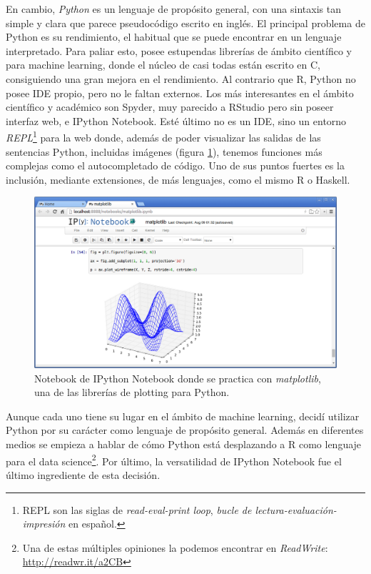 En cambio, \emph{Python} es un lenguaje de propósito general, con una sintaxis tan simple y clara que parece pseudocódigo escrito en inglés. El principal problema de Python es su rendimiento, el habitual que se puede encontrar en un lenguaje interpretado. Para paliar esto, posee estupendas librerías de ámbito científico y para machine learning, donde el núcleo de casi todas están escrito en C, consiguiendo una gran mejora en el rendimiento. Al contrario que R, Python no posee IDE propio, pero no le faltan externos. Los más interesantes en el ámbito científico y académico son Spyder, muy parecido a RStudio pero sin poseer interfaz web, e IPython Notebook. Esté último no es un IDE, sino un entorno \emph{REPL}\footnote{REPL son las siglas de \emph{read-eval-print loop}, \emph{bucle de lectura-evaluación-impresión} en español.} para la web donde, además de poder visualizar las salidas de las sentencias Python, incluidas imágenes (figura \ref{fig:4.2}), tenemos funciones más complejas como el autocompletado de código. Uno de sus puntos fuertes es la inclusión, mediante extensiones, de más lenguajes, como el mismo R o Haskell.

\begin{figure}[H]
  \centering
  \includegraphics[width=133mm]{figures/ch_04/ipython_notebook.png}
  \caption{Notebook de IPython Notebook donde se practica con \emph{matplotlib}, una de las librerías de plotting para Python.}
  \label{fig:4.2}
\end{figure}

Aunque cada uno tiene su lugar en el ámbito de machine learning, decidí utilizar Python por su carácter como lenguaje de propósito general. Además en diferentes medios se empieza a hablar de cómo Python está desplazando a R como lenguaje para el data science\footnote{Una de estas múltiples opiniones la podemos encontrar en \emph{ReadWrite}: \url{http://readwr.it/a2CB}}. Por último, la versatilidad de IPython Notebook fue el último ingrediente de esta decisión.

